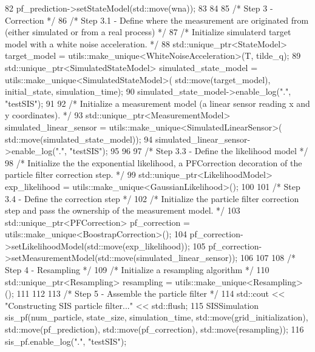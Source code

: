\begin{DoxyCodeInclude}
82     pf\_prediction->setStateModel(std::move(wna));
83 
84 
85     \textcolor{comment}{/* Step 3 - Correction */}
86     \textcolor{comment}{/* Step 3.1 - Define where the measurement are originated from (either simulated or from a real
       process) */}
87     \textcolor{comment}{/* Initialize simulaterd target model with a white noise acceleration. */}
88     std::unique\_ptr<StateModel> target\_model = utils::make\_unique<WhiteNoiseAcceleration>(T, tilde\_q);
89     std::unique\_ptr<SimulatedStateModel> simulated\_state\_model = utils::make\_unique<SimulatedStateModel>(
      std::move(target\_model), initial\_state, simulation\_time);
90     simulated\_state\_model->enable\_log(\textcolor{stringliteral}{"."}, \textcolor{stringliteral}{"testSIS"});
91 
92     \textcolor{comment}{/* Initialize a measurement model (a linear sensor reading x and y coordinates). */}
93     std::unique\_ptr<MeasurementModel> simulated\_linear\_sensor = utils::make\_unique<SimulatedLinearSensor>(
      std::move(simulated\_state\_model));
94     simulated\_linear\_sensor->enable\_log(\textcolor{stringliteral}{"."}, \textcolor{stringliteral}{"testSIS"});
95 
96 
97     \textcolor{comment}{/* Step 3.3 - Define the likelihood model */}
98     \textcolor{comment}{/* Initialize the the exponential likelihood, a PFCorrection decoration of the particle filter
       correction step. */}
99     std::unique\_ptr<LikelihoodModel> exp\_likelihood = utils::make\_unique<GaussianLikelihood>();
100 
101     \textcolor{comment}{/* Step 3.4 - Define the correction step */}
102     \textcolor{comment}{/* Initialize the particle filter correction step and pass the ownership of the measurement model. */}
103     std::unique\_ptr<PFCorrection> pf\_correction = utils::make\_unique<BoostrapCorrection>();
104     pf\_correction->setLikelihoodModel(std::move(exp\_likelihood));
105     pf\_correction->setMeasurementModel(std::move(simulated\_linear\_sensor));
106 
107 
108     \textcolor{comment}{/* Step 4 - Resampling */}
109     \textcolor{comment}{/* Initialize a resampling algorithm */}
110     std::unique\_ptr<Resampling> resampling = utils::make\_unique<Resampling>();
111 
112 
113     \textcolor{comment}{/* Step 5 - Assemble the particle filter */}
114     std::cout << \textcolor{stringliteral}{"Constructing SIS particle filter..."} << std::flush;
115     SISSimulation sis\_pf(num\_particle, state\_size, simulation\_time, std::move(grid\_initialization), 
      std::move(pf\_prediction), std::move(pf\_correction), std::move(resampling));
116     sis\_pf.enable\_log(\textcolor{stringliteral}{"."}, \textcolor{stringliteral}{"testSIS"});

\end{DoxyCodeInclude}
